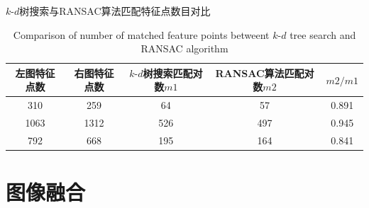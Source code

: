 \documentclass[10.5pt,a4paper]{article}
\numberwithin{equation}{section}
\numberwithin{figure}{section}
\numberwithin{table}{section}
\begin{document}
\begin{table}[H]
\centering
\caption{$k\text{-}d$树搜索与RANSAC算法匹配特征点数目对比\label{compareKdRansac}}
\renewcommand\tablename{Table}
\addtocounter{table}{-1}
\caption{Comparison of number of matched feature points betweent $k\text{-}d$ tree search and RANSAC algorithm}
\begin{tabular}{ccccc}
\toprule
左图特征点数 & 右图特征点数 & $k\text{-}d$树搜索匹配对数$m1$ & RANSAC算法匹配对数$m2$& $m2/m1$\\
\midrule
310 & 259 & 64  & 57 & 0.891\\ 
1063& 1312& 526 & 497& 0.945\\
792 & 668 & 195 & 164& 0.841\\
\bottomrule
\end{tabular}
\end{table}
\par
\newpage
\section{图像融合\label{sectionRonghe}}
\end{document}
